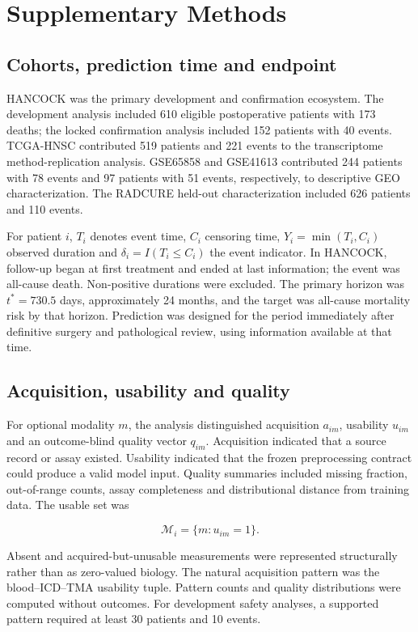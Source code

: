 \documentclass[pdflatex,sn-nature]{sn-jnl}
\begin{document}
\section*{Supplementary Methods}

\subsection*{Cohorts, prediction time and endpoint}

HANCOCK was the primary development and confirmation ecosystem. The development analysis included 610 eligible postoperative patients with 173 deaths; the locked confirmation analysis included 152 patients with 40 events. TCGA-HNSC contributed 519 patients and 221 events to the transcriptome method-replication analysis. GSE65858 and GSE41613 contributed 244 patients with 78 events and 97 patients with 51 events, respectively, to descriptive GEO characterization. The RADCURE held-out characterization included 626 patients and 110 events.

For patient \(i\), \(T_i\) denotes event time, \(C_i\) censoring time, \(Y_i=\min(T_i,C_i)\) observed duration and \(\delta_i=I(T_i\le C_i)\) the event indicator. In HANCOCK, follow-up began at first treatment and ended at last information; the event was all-cause death. Non-positive durations were excluded. The primary horizon was \(t^*=730.5\) days, approximately 24 months, and the target was all-cause mortality risk by that horizon. Prediction was designed for the period immediately after definitive surgery and pathological review, using information available at that time.

\subsection*{Acquisition, usability and quality}

For optional modality \(m\), the analysis distinguished acquisition \(a_{im}\), usability \(u_{im}\) and an outcome-blind quality vector \(q_{im}\). Acquisition indicated that a source record or assay existed. Usability indicated that the frozen preprocessing contract could produce a valid model input. Quality summaries included missing fraction, out-of-range counts, assay completeness and distributional distance from training data. The usable set was


\[
\mathcal{M}_i=\{m:u_{im}=1\}.
\]

Absent and acquired-but-unusable measurements were represented structurally rather than as zero-valued biology. The natural acquisition pattern was the blood--ICD--TMA usability tuple. Pattern counts and quality distributions were computed without outcomes. For development safety analyses, a supported pattern required at least 30 patients and 10 events.
\end{document}
